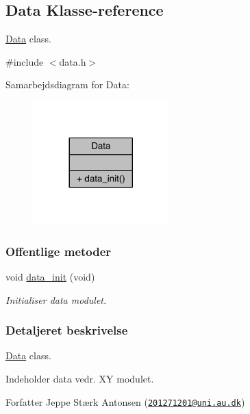 \hypertarget{class_data}{}\subsection{Data Klasse-\/reference}
\label{class_data}


\hyperlink{class_data}{Data} class.  




{\ttfamily \#include $<$data.\+h$>$}



Samarbejdsdiagram for Data\+:
\nopagebreak
\begin{figure}[H]
\begin{center}
\leavevmode
\includegraphics[width=149pt]{da/d91/class_data__coll__graph}
\end{center}
\end{figure}
\subsubsection*{Offentlige metoder}
\begin{DoxyCompactItemize}
\item 
void \hyperlink{class_data_adf37c815716edf228a3cbb4564290275}{data\+\_\+init} (void)
\begin{DoxyCompactList}\small\item\em Initialiser data modulet. \end{DoxyCompactList}\end{DoxyCompactItemize}


\subsubsection{Detaljeret beskrivelse}
\hyperlink{class_data}{Data} class. 

Indeholder data vedr. XY modulet. \begin{DoxyAuthor}{Forfatter}
Jeppe Stærk Antonsen (\href{mailto:201271201@uni.au.dk}{\tt 201271201@uni.\+au.\+dk}) 
\end{DoxyAuthor}


